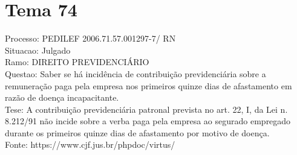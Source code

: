 \documentclass[12pt]{article}
\begin{document}
\section*{Tema 74}
Processo: PEDILEF 2006.71.57.001297-7/ RN\\
Situacao: Julgado\\
Ramo: DIREITO PREVIDENCIÁRIO\\
Questao: Saber se há incidência de contribuição previdenciária sobre a remuneração paga pela empresa nos primeiros quinze dias de afastamento em razão de doença incapacitante.\\
Tese: A contribuição previdenciária patronal prevista no art. 22, I, da Lei n. 8.212/91 não incide sobre a verba paga pela empresa ao segurado empregado durante os primeiros quinze dias de afastamento por motivo de doença.\\
Fonte: https://www.cjf.jus.br/phpdoc/virtus/
\end{document}
